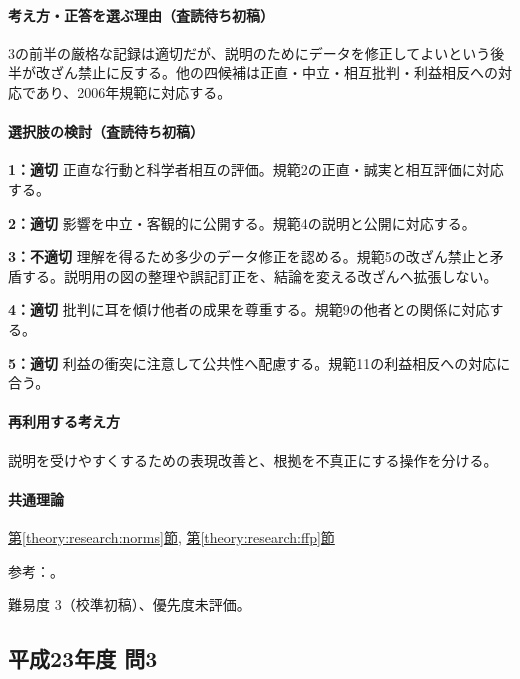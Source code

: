 \paragraph{考え方・正答を選ぶ理由（査読待ち初稿）} 3の前半の厳格な記録は適切だが、説明のためにデータを修正してよいという後半が改ざん禁止に反する。他の四候補は正直・中立・相互批判・利益相反への対応であり、2006年規範に対応する。

\paragraph{選択肢の検討（査読待ち初稿）}\mbox{}\par

\noindent\textbf{1：適切} 正直な行動と科学者相互の評価。規範2の正直・誠実と相互評価に対応する。\par

\noindent\textbf{2：適切} 影響を中立・客観的に公開する。規範4の説明と公開に対応する。\par

\noindent\textbf{3：不適切} 理解を得るため多少のデータ修正を認める。規範5の改ざん禁止と矛盾する。説明用の図の整理や誤記訂正を、結論を変える改ざんへ拡張しない。\par

\noindent\textbf{4：適切} 批判に耳を傾け他者の成果を尊重する。規範9の他者との関係に対応する。\par

\noindent\textbf{5：適切} 利益の衝突に注意して公共性へ配慮する。規範11の利益相反への対応に合う。\par

\paragraph{再利用する考え方} 説明を受けやすくするための表現改善と、根拠を不真正にする操作を分ける。

\paragraph{共通理論} \hyperref[theory:research:norms]{第\ref*{theory:research:norms}節}, \hyperref[theory:research:ffp]{第\ref*{theory:research:ffp}節}

\par 参考：\cite{scj_code2006}。

\par 難易度 3（校準初稿）、優先度未評価。

\subsection{平成23年度 問3}
\label{q:h23-reg-apt-03}

